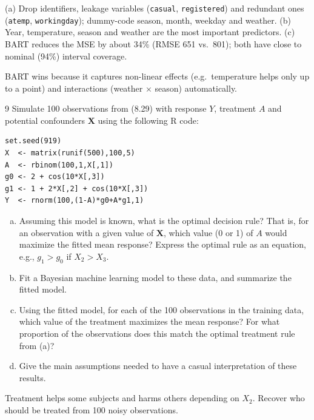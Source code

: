 \documentclass[11pt]{article}
\begin{document}
\begin{answer}
(a) Drop identifiers, leakage variables (\texttt{casual}, \texttt{registered}) and redundant ones (\texttt{atemp}, \texttt{workingday}); dummy-code season, month, weekday and weather. (b) Year, temperature, season and weather are the most important predictors. (c) BART reduces the MSE by about 34\% (RMSE 651 vs.\ 801); both have close to nominal (94\%) interval coverage.
\end{answer}

\begin{takeaway}
BART wins because it captures non-linear effects (e.g.\ temperature helps only up to a point) and interactions (weather $\times$ season) automatically.
\end{takeaway}


\begin{problem}{9}
Simulate 100 observations from (8.29) with response $Y$, treatment $A$ and potential confounders $\mathbf X$ using the following R code:
\begin{lstlisting}
set.seed(919)
X  <- matrix(runif(500),100,5)
A  <- rbinom(100,1,X[,1])
g0 <- 2 + cos(10*X[,3])
g1 <- 1 + 2*X[,2] + cos(10*X[,3])
Y  <- rnorm(100,(1-A)*g0+A*g1,1)
\end{lstlisting}
\begin{enumerate}[(a)]
\item Assuming this model is known, what is the optimal decision rule? That is, for an observation with a given value of $\mathbf X$, which value (0 or 1) of $A$ would maximize the fitted mean response? Express the optimal rule as an equation, e.g., $g_1>g_0$ if $X_2>X_3$.
\item Fit a Bayesian machine learning model to these data, and summarize the fitted model.
\item Using the fitted model, for each of the 100 observations in the training data, which value of the treatment maximizes the mean response? For what proportion of the observations does this match the optimal treatment rule from (a)?
\item Give the main assumptions needed to have a casual interpretation of these results.
\end{enumerate}
\end{problem}

\begin{restate}
Treatment helps some subjects and harms others depending on $X_2$. Recover who should be treated from 100 noisy observations.
\end{restate}
\end{document}
